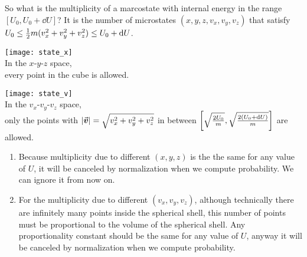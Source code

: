 \documentclass[class=article, crop=false, 12pt]{standalone}
\begin{document}
So what is the multiplicity of a marcostate with internal energy in the range $[U_0,U_0+\dd{U}]$?
It is the number of microstates $(x,y,z, v_x,v_y,v_z)$ that satisfy $U_0\leq \frac{1}{2} m(v_x^2+v_y^2+v_z^2)\leq U_0+\dd{U}$.

\begin{center}
    \begin{minipage}{0.46\linewidth}
        \centering
        \texttt{[image: state\_x]}\\
        In the $x$-$y$-$z$ space,\\
        every point in the cube is allowed.
    \end{minipage}
    \hspace{0.02\textwidth}
    \vline
    \hspace{0.02\textwidth}
    \begin{minipage}{0.46\linewidth}
        \centering
        \texttt{[image: state\_v]}\\
        In the $v_x$-$v_y$-$v_z$ space,\\
        only the points with $|\va*{v}| = \sqrt{v_x^2+v_y^2+v_z^2}$ in between 
        $\qty[\sqrt{\frac{2U_0}{m}}, \sqrt{\frac{2(U_0+\dd{U})}{m}}]$ are allowed.\\
    \end{minipage}
\end{center}



\begin{enumerate}
    \item Because multiplicity due to different $(x,y,z)$ is the the same for any value of $U$,
    it will be canceled by normalization when we compute probability.
    We can ignore it from now on.

    \item For the multiplicity due to different $(v_x,v_y,v_z)$,
    although technically there are infinitely many points inside the spherical shell,
    this number of points must be proportional to the volume of the spherical shell.
    Any proportionality constant should be the same for any value of $U$, 
    anyway it will be canceled by normalization when we compute probability.

\end{enumerate}
\end{document}
